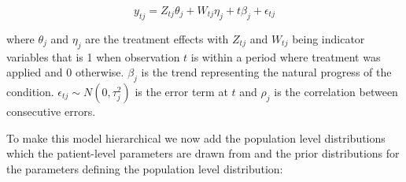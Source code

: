 \documentclass[12pt,a4paper,leqno]{report}
\theoremstyle{plain}
\theoremstyle{definition}
\theoremstyle{remark}
\begin{document}
\begin{def}\label{hierarchicalmodel}
    \begin{equation}\label{}
        y_{tj} = Z_{tj}\theta_{j} + W_{tj}\eta_{j} + t\beta_{j} + \epsilon_{tj}
    \end{equation}
\end{def} where \(\theta_{j} \) and \(\eta_{j} \) are the treatment effects with \(Z_{tj}\) and \(W_{tj}\) being indicator
variables that is 1 when observation \(t\) is within a period where treatment was applied and
0 otherwise. \(\beta_j\) is the trend representing the natural progress of the
condition. \(\epsilon_{tj} \sim N(0,\tau_j^2) \) is the error term at \(t\) and
\(\rho_j\) is the correlation between consecutive errors.

To make this model hierarchical we now add the population level distributions which
the patient-level parameters are drawn from and the prior distributions for the
parameters defining the population level distribution:

\end{document}
